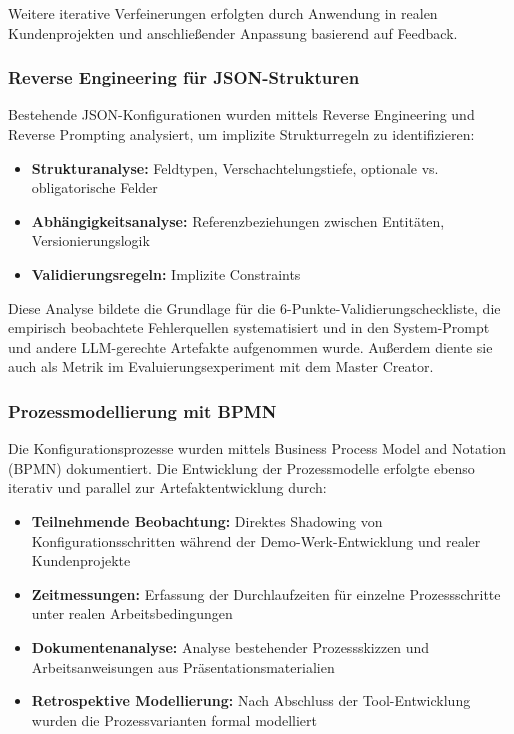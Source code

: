 \noindent Weitere iterative Verfeinerungen erfolgten durch Anwendung in realen Kundenprojekten und anschließender Anpassung basierend auf Feedback.

\subsubsection{Reverse Engineering für JSON-Strukturen}
\label{subsubsec:ReverseEngineering}

Bestehende JSON-Konfigurationen wurden mittels Reverse Engineering und Reverse Prompting analysiert, um implizite Strukturregeln zu identifizieren:

\begin{itemize}
    \item \textbf{Strukturanalyse:} Feldtypen, Verschachtelungstiefe, optionale vs. obligatorische Felder
    \item \textbf{Abhängigkeitsanalyse:} Referenzbeziehungen zwischen Entitäten, Versionierungslogik
    \item \textbf{Validierungsregeln:} Implizite Constraints
\end{itemize}

\noindent Diese Analyse bildete die Grundlage für die 6-Punkte-Validierungscheckliste, die empirisch beobachtete Fehlerquellen systematisiert und in den System-Prompt und andere LLM-gerechte Artefakte aufgenommen wurde. Außerdem diente sie auch als Metrik im Evaluierungsexperiment mit dem Master Creator.

\subsubsection{Prozessmodellierung mit BPMN}
\label{subsubsec:Prozessmodellierung}

Die Konfigurationsprozesse wurden mittels Business Process Model and Notation (BPMN) dokumentiert. Die Entwicklung der Prozessmodelle erfolgte ebenso iterativ und parallel zur Artefaktentwicklung durch:

\begin{itemize}
    \item \textbf{Teilnehmende Beobachtung:} Direktes Shadowing von Konfigurationsschritten während der Demo-Werk-Entwicklung und realer Kundenprojekte
    \item \textbf{Zeitmessungen:} Erfassung der Durchlaufzeiten für einzelne Prozessschritte unter realen Arbeitsbedingungen
    \item \textbf{Dokumentenanalyse:} Analyse bestehender Prozessskizzen und Arbeitsanweisungen aus Präsentationsmaterialien \citep{seitcom:grace_start_praesentation2024, seitcom:grace_test_praesentation2024, seitcom:grace_pitch_deck2024, grace:onboarding2024, seitcom:grace_investor_pitch2024}
    \item \textbf{Retrospektive Modellierung:} Nach Abschluss der Tool-Entwicklung wurden die Prozessvarianten formal modelliert
\end{itemize}

